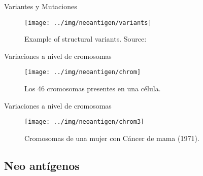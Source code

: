 \documentclass[10pt]{beamer}
\newcommand{\1}{
	\setbeamertemplate{background}{
		\texttt{[image: ../img/1]}
		\tikz[overlay] \fill[fill opacity=0.75,fill=white] (0,0) rectangle (-\paperwidth,\paperheight);
	}
}
\begin{document}
\begin{frame}{Variantes y Mutaciones}{}
	\begin{figure}[h]
		\centering
		\texttt{[image: ../img/neoantigen/variants]}
		\caption{Example of structural variants. Source: \cite{sv_pacbio_2021}}
		\label{fig:variants}
	\end{figure}	
\end{frame}


\begin{frame}{Variaciones a nivel de cromosomas}{}
	\begin{figure}
		\centering
		\texttt{[image: ../img/neoantigen/chrom]}
		\caption{Los 46 cromosomas presentes en una célula.}
	\end{figure}		
\end{frame}

\begin{frame}{Variaciones a nivel de cromosomas}{}
	\begin{figure}
		\centering
		\texttt{[image: ../img/neoantigen/chrom3]}
		\caption{Cromosomas de una mujer con Cáncer de mama (1971).}
	\end{figure}		
\end{frame}

\subsection{Neo antígenos}
\end{document}
